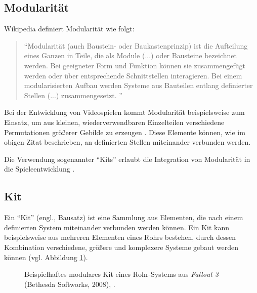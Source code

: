 \subsection{Modularität}
Wikipedia definiert Modularität wie folgt:
\begin{quote}
\enquote{Modularität (auch Baustein- oder Baukastenprinzip) ist die Aufteilung eines Ganzen in Teile, die als Module (...) oder Bausteine bezeichnet werden. Bei geeigneter Form und Funktion können sie zusammengefügt werden oder über entsprechende Schnittstellen interagieren. Bei einem modularisierten Aufbau werden Systeme aus Bauteilen entlang definierter Stellen (...) zusammengesetzt.
} \parencite{moduwiki}
\end{quote}
Bei der Entwicklung von Videospielen kommt Modularität beispielsweise zum Einsatz, um aus kleinen, wiederverwendbaren Einzelteilen verschiedene Permutationen größerer Gebilde zu erzeugen \parencite{Meler}. Diese Elemente können, wie im obigen Zitat beschrieben, an definierten Stellen miteinander verbunden werden.
\par
Die Verwendung sogenannter \enquote{Kits} erlaubt die Integration von Modularität in die Spieleentwicklung \parencite{Burgess}.
\newpage
\subsection{Kit}
Ein \enquote{Kit} (engl., Bausatz) ist eine Sammlung aus Elementen, die nach einem definierten System miteinander verbunden werden können. Ein Kit kann beispielsweise aus mehreren Elementen eines Rohrs bestehen, durch dessen Kombination verschiedene, größere und komplexere Systeme gebaut werden können (vgl. Abbildung \ref{pipes}). \parencite{Burgess}
\begin{figure}[H]
\centering
  \caption{Beispielhaftes modulares Kit eines Rohr-Systems aus \textit{Fallout 3} (Bethesda Softworks, 2008), \parencite{Burgess}.}
\label{pipes}
\end{figure}

